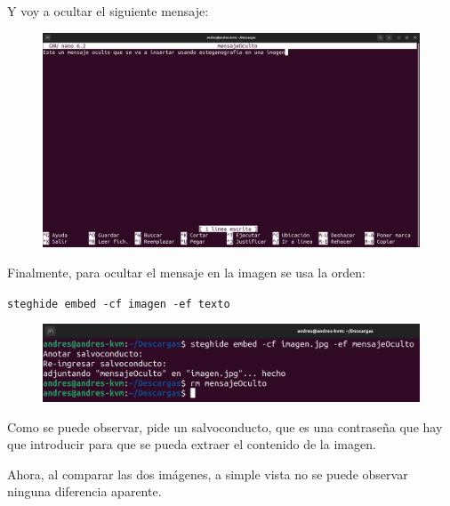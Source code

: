 \documentclass{article}
\begin{document}
Y voy a ocultar el siguiente mensaje:

\begin{figure}[H]
    \includegraphics[width=\textwidth]{imagenes/Captura desde 2022-10-30 11-27-46.png}
\end{figure}

\bigskip

Finalmente, para ocultar el mensaje en la imagen se usa la orden:

\verb|steghide embed -cf imagen -ef texto|

\begin{figure}[H]
    \includegraphics[width=\textwidth]{imagenes/Captura desde 2022-10-30 11-30-08.png}
\end{figure}

\bigskip

Como se puede observar, pide un salvoconducto, que es una contraseña que hay que introducir para que se pueda extraer el contenido de la imagen.

\bigskip

Ahora, al comparar las dos imágenes, a simple vista no se puede observar ninguna diferencia aparente.
\end{document}
